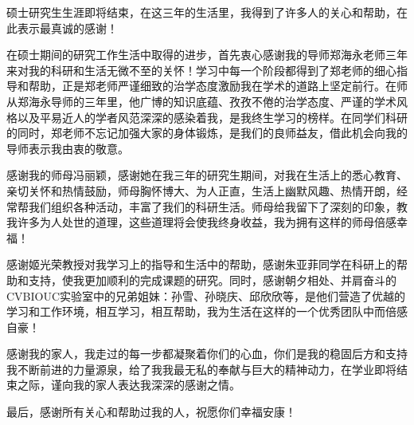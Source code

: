 
\begin{ack}
硕士研究生生涯即将结束，在这三年的生活里，我得到了许多人的关心和帮助，在此表示最真诚的感谢！

在硕士期间的研究工作生活中取得的进步，首先衷心感谢我的导师郑海永老师三年来对我的科研和生活无微不至的关怀！学习中每一个阶段都得到了郑老师的细心指导和帮助，正是郑老师严谨细致的治学态度激励我在学术的道路上坚定前行。在师从郑海永导师的三年里，他广博的知识底蕴、孜孜不倦的治学态度、严谨的学术风格以及平易近人的学者风范深深的感染着我，是我终生学习的榜样。在同学们科研的同时，郑老师不忘记加强大家的身体锻炼，是我们的良师益友，借此机会向我的导师表示我由衷的敬意。

感谢我的师母冯丽颖，感谢她在我三年的研究生期间，对我在生活上的悉心教育、亲切关怀和热情鼓励，师母胸怀博大、为人正直，生活上幽默风趣、热情开朗，经常帮我们组织各种活动，丰富了我们的科研生活。师母给我留下了深刻的印象，教我许多为人处世的道理，这些道理将会使我终身收益，我为拥有这样的师母倍感幸福！

感谢姬光荣教授对我学习上的指导和生活中的帮助，感谢朱亚菲同学在科研上的帮助和支持，使我更加顺利的完成课题的研究。同时，感谢朝夕相处、并肩奋斗的CVBIOUC实验室中的兄弟姐妹：孙雪、孙晓庆、邱欣欣等，是他们营造了优越的学习和工作环境，相互学习，相互帮助，我为生活在这样的一个优秀团队中而倍感自豪！

感谢我的家人，我走过的每一步都凝聚着你们的心血，你们是我的稳固后方和支持我不断前进的力量源泉，给了我我最无私的奉献与巨大的精神动力，在学业即将结束之际，谨向我的家人表达我深深的感谢之情。

最后，感谢所有关心和帮助过我的人，祝愿你们幸福安康！
\end{ack}
